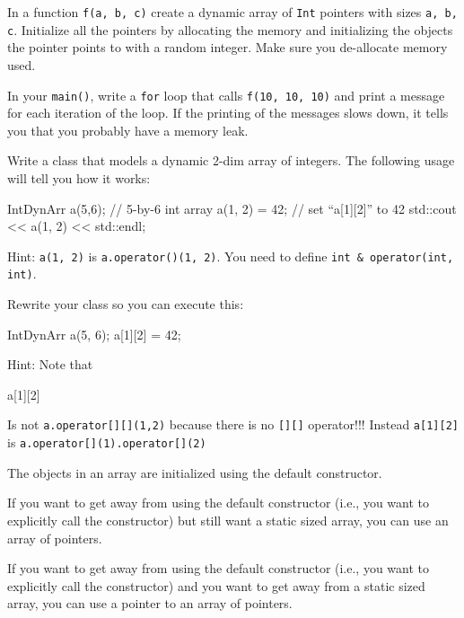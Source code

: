 \begin{ex} In a function \texttt{f(a, b, c)} create a dynamic
array of \texttt{Int} pointers with sizes \texttt{a, b, c}. Initialize all
the pointers by allocating the memory and initializing the objects the
pointer points to with a random integer. Make sure you de-allocate
memory used.

In your \texttt{main()}, write a \texttt{for} loop that calls \texttt{f(10,
10, 10)} and print a message for each iteration of the loop. If the
printing of the messages slows down, it tells you that you probably have
a memory leak.
\end{ex}
\begin{ex}Write a class that models a dynamic 2-dim array of
integers. The following usage will tell you how it works:
\begin{console}
IntDynArr a(5,6); // 5-by-6 int array
a(1, 2) = 42;     // set ``a[1][2]'' to 42
std::cout << a(1, 2) << std::endl;
\end{console}
Hint: \texttt{a(1, 2)} is \texttt{a.operator()(1, 2)}. You need to define
\texttt{int \& operator(int, int)}.
\end{ex}
\begin{ex} Rewrite your class so you can execute this:
\begin{console}
IntDynArr a(5, 6);
a[1][2] = 42;
\end{console}
Hint: Note that
\begin{console}
a[1][2]
\end{console}          
Is not \texttt{a.operator[][](1,2)} because there is no
\texttt{[][]} operator!!! Instead \texttt{a[1][2]} is
\texttt{a.operator[](1).operator[](2)}
\end{ex}

\newpage{}

The objects in an array are initialized using the default constructor.

If you want to get away from using the default constructor (i.e., you
want to explicitly call the constructor) but still want a static sized
array, you can use an array of pointers.

If you want to get away from using the default constructor (i.e., you
want to explicitly call the constructor) and you want to get away from a
static sized array, you can use a pointer to an array of pointers.
